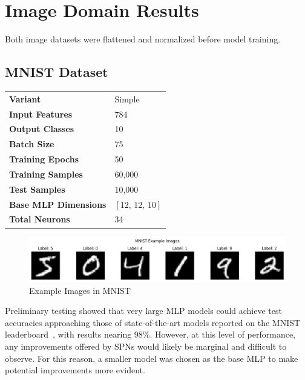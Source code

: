 
\section{Image Domain Results}

Both image datasets were flattened and normalized before model training.

\subsection{MNIST Dataset}

\begin{tabular}{@{}ll@{}}
\textbf{Variant} & Simple \\
\textbf{Input Features} & 784 \\
\textbf{Output Classes} & 10 \\
\textbf{Batch Size} & 75 \\
\textbf{Training Epochs} & 50 \\
\textbf{Training Samples} & 60,000 \\
\textbf{Test Samples} & 10,000 \\
\textbf{Base MLP Dimensions} & $[12,\, 12,\, 10]$ \\
\textbf{Total Neurons} & 34 \\
\end{tabular}

\begin{figure}[H]
    \centering
    \includegraphics[width=1.0\textwidth]{Figures/Results/MNIST/examples.png} 
    \captionsetup{justification=centering}  %
    \caption{Example Images in MNIST}
    \label{fig:mnistexamples}
\end{figure}

Preliminary testing showed that very large MLP models could achieve test accuracies approaching those of state-of-the-art models reported on the MNIST leaderboard~\cite{pwc_mnist_leaderboard}, with results nearing 98\%. However, at this level of performance, any improvements offered by SPNs would likely be marginal and difficult to observe. For this reason, a smaller model was chosen as the base MLP to make potential improvements more evident.

